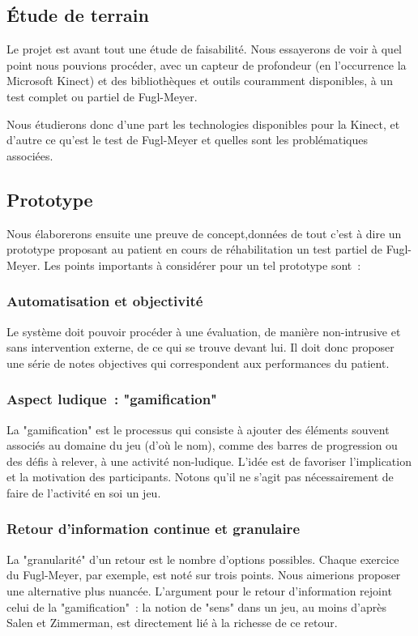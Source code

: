 \documentclass[french,12pt]{report}
\begin{document}
			\subsection{Étude de terrain} \label{etude_terrain}
		Le projet est avant tout une étude de faisabilité. Nous essayerons de voir
		à quel point nous pouvions procéder, avec un capteur de profondeur (en
		l'occurrence la Microsoft Kinect) et des bibliothèques et outils couramment 
		disponibles, à un test complet ou partiel de Fugl-Meyer.
		
		Nous étudierons donc d'une part les technologies disponibles pour la Kinect,
		et d'autre ce qu'est le test de Fugl-Meyer et quelles sont les 
		problématiques associées.
		
		\subsection{Prototype}
		Nous élaborerons ensuite une preuve de concept,données de tout c'est à dire un 
		prototype proposant au patient en cours de réhabilitation un test partiel 
		de Fugl-Meyer. Les points importants à considérer pour un tel prototype 
		sont~:
		\subsubsection{Automatisation et objectivité}
		Le système doit pouvoir procéder à une évaluation, de manière non-intrusive 
		et sans intervention externe, de ce qui se trouve devant lui. Il doit donc 
		proposer une série de notes objectives qui correspondent aux performances du 
		patient.
		\subsubsection{Aspect ludique~: "gamification"}
		La "gamification" est le processus qui consiste à ajouter des éléments 
		souvent associés au domaine du jeu (d'où le nom), comme des barres de
		progression ou des défis à relever, à une activité non-ludique. L'idée est 
		de favoriser l'implication et la motivation des participants. 
		Notons qu'il ne s'agit pas nécessairement de faire de l'activité en soi un 
		jeu.
    \subsubsection{Retour d'information continue et granulaire}
    La "granularité" d'un retour est le nombre d'options possibles. 
    Chaque exercice du Fugl-Meyer, par exemple, est noté sur trois points. Nous 
    aimerions proposer une alternative plus nuancée.
    L'argument pour le retour d'information rejoint celui de la "gamification"~:
    la notion de "sens" dans un jeu, au moins d'après Salen et Zimmerman, est 
    directement lié à la richesse de ce retour.
    
\end{document}
